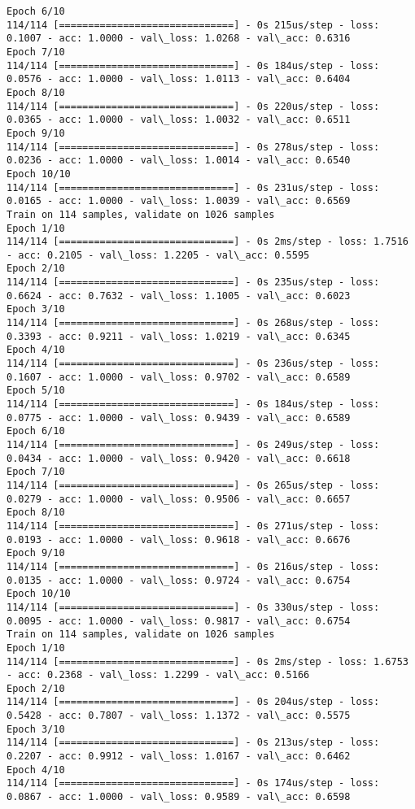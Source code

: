 \documentclass[11pt]{article}
\begin{document}
\begin{Verbatim}[commandchars=\\\{\}]
Epoch 6/10
114/114 [==============================] - 0s 215us/step - loss: 0.1007 - acc: 1.0000 - val\_loss: 1.0268 - val\_acc: 0.6316
Epoch 7/10
114/114 [==============================] - 0s 184us/step - loss: 0.0576 - acc: 1.0000 - val\_loss: 1.0113 - val\_acc: 0.6404
Epoch 8/10
114/114 [==============================] - 0s 220us/step - loss: 0.0365 - acc: 1.0000 - val\_loss: 1.0032 - val\_acc: 0.6511
Epoch 9/10
114/114 [==============================] - 0s 278us/step - loss: 0.0236 - acc: 1.0000 - val\_loss: 1.0014 - val\_acc: 0.6540
Epoch 10/10
114/114 [==============================] - 0s 231us/step - loss: 0.0165 - acc: 1.0000 - val\_loss: 1.0039 - val\_acc: 0.6569
Train on 114 samples, validate on 1026 samples
Epoch 1/10
114/114 [==============================] - 0s 2ms/step - loss: 1.7516 - acc: 0.2105 - val\_loss: 1.2205 - val\_acc: 0.5595
Epoch 2/10
114/114 [==============================] - 0s 235us/step - loss: 0.6624 - acc: 0.7632 - val\_loss: 1.1005 - val\_acc: 0.6023
Epoch 3/10
114/114 [==============================] - 0s 268us/step - loss: 0.3393 - acc: 0.9211 - val\_loss: 1.0219 - val\_acc: 0.6345
Epoch 4/10
114/114 [==============================] - 0s 236us/step - loss: 0.1607 - acc: 1.0000 - val\_loss: 0.9702 - val\_acc: 0.6589
Epoch 5/10
114/114 [==============================] - 0s 184us/step - loss: 0.0775 - acc: 1.0000 - val\_loss: 0.9439 - val\_acc: 0.6589
Epoch 6/10
114/114 [==============================] - 0s 249us/step - loss: 0.0434 - acc: 1.0000 - val\_loss: 0.9420 - val\_acc: 0.6618
Epoch 7/10
114/114 [==============================] - 0s 265us/step - loss: 0.0279 - acc: 1.0000 - val\_loss: 0.9506 - val\_acc: 0.6657
Epoch 8/10
114/114 [==============================] - 0s 271us/step - loss: 0.0193 - acc: 1.0000 - val\_loss: 0.9618 - val\_acc: 0.6676
Epoch 9/10
114/114 [==============================] - 0s 216us/step - loss: 0.0135 - acc: 1.0000 - val\_loss: 0.9724 - val\_acc: 0.6754
Epoch 10/10
114/114 [==============================] - 0s 330us/step - loss: 0.0095 - acc: 1.0000 - val\_loss: 0.9817 - val\_acc: 0.6754
Train on 114 samples, validate on 1026 samples
Epoch 1/10
114/114 [==============================] - 0s 2ms/step - loss: 1.6753 - acc: 0.2368 - val\_loss: 1.2299 - val\_acc: 0.5166
Epoch 2/10
114/114 [==============================] - 0s 204us/step - loss: 0.5428 - acc: 0.7807 - val\_loss: 1.1372 - val\_acc: 0.5575
Epoch 3/10
114/114 [==============================] - 0s 213us/step - loss: 0.2207 - acc: 0.9912 - val\_loss: 1.0167 - val\_acc: 0.6462
Epoch 4/10
114/114 [==============================] - 0s 174us/step - loss: 0.0867 - acc: 1.0000 - val\_loss: 0.9589 - val\_acc: 0.6598

\end{Verbatim}
\end{document}
